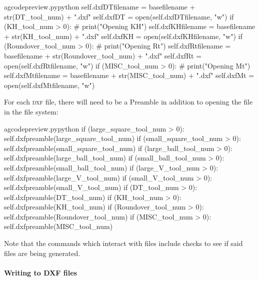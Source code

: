 \documentclass{ltxdoc}
\begin{document}
\begin{writecode}{a}{gcodepreview.py}{python}
                self.dxfDTfilename = basefilename + str(DT_tool_num) + ".dxf"
                self.dxfDT = open(self.dxfDTfilename, "w")
            if (KH_tool_num > 0):
#                print("Opening KH")
                self.dxfKHfilename = basefilename + str(KH_tool_num) + ".dxf"
                self.dxfKH = open(self.dxfKHfilename, "w")
            if (Roundover_tool_num > 0):
#                print("Opening Rt")
                self.dxfRtfilename = basefilename + str(Roundover_tool_num) + ".dxf"
                self.dxfRt = open(self.dxfRtfilename, "w")
            if (MISC_tool_num > 0):
#                print("Opening Mt")
                self.dxfMtfilename = basefilename + str(MISC_tool_num) + ".dxf"
                self.dxfMt = open(self.dxfMtfilename, "w")
\end{writecode}
\addtocounter{gcpy}{79}

For each \textsc{dxf} file, there will need to be a Preamble in addition to opening the file in the file system:

\lstset{firstnumber=\thegcpy}
\begin{writecode}{a}{gcodepreview.py}{python}
            if (large_square_tool_num > 0):
                self.dxfpreamble(large_square_tool_num)
            if (small_square_tool_num > 0):
                self.dxfpreamble(small_square_tool_num)
            if (large_ball_tool_num > 0):
                self.dxfpreamble(large_ball_tool_num)
            if (small_ball_tool_num > 0):
                self.dxfpreamble(small_ball_tool_num)
            if (large_V_tool_num > 0):
                self.dxfpreamble(large_V_tool_num)
            if (small_V_tool_num > 0):
                self.dxfpreamble(small_V_tool_num)
            if (DT_tool_num > 0):
                self.dxfpreamble(DT_tool_num)
            if (KH_tool_num > 0):
                self.dxfpreamble(KH_tool_num)
            if (Roundover_tool_num > 0):
                self.dxfpreamble(Roundover_tool_num)
            if (MISC_tool_num > 0):
                self.dxfpreamble(MISC_tool_num)

\end{writecode}
\addtocounter{gcpy}{21}

Note that the commands which interact with files include checks to see if said files are being generated.

\paragraph{Writing to DXF files}
 
\end{document}
